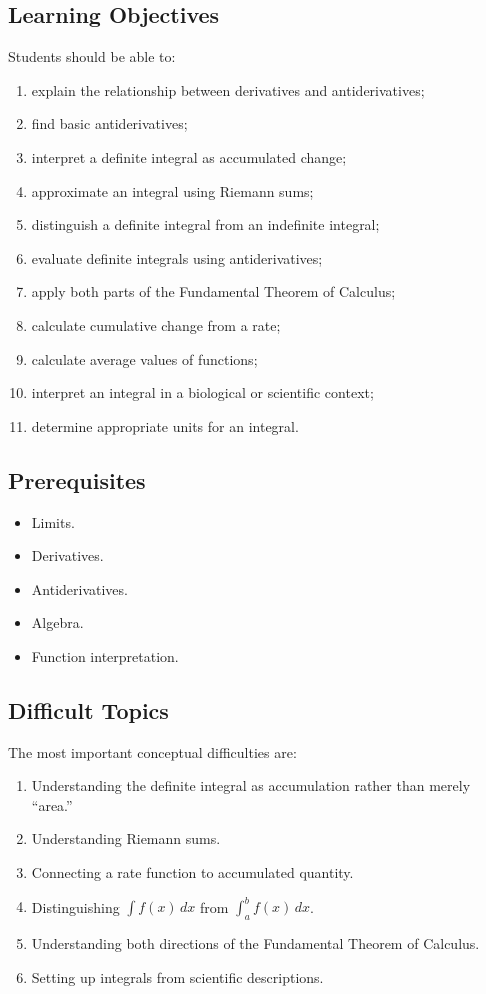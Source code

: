 \documentclass[11pt]{article}
\begin{document}
\subsection{Learning Objectives}

Students should be able to:

\begin{enumerate}
    \item explain the relationship between derivatives and antiderivatives;
    \item find basic antiderivatives;
    \item interpret a definite integral as accumulated change;
    \item approximate an integral using Riemann sums;
    \item distinguish a definite integral from an indefinite integral;
    \item evaluate definite integrals using antiderivatives;
    \item apply both parts of the Fundamental Theorem of Calculus;
    \item calculate cumulative change from a rate;
    \item calculate average values of functions;
    \item interpret an integral in a biological or scientific context;
    \item determine appropriate units for an integral.
\end{enumerate}

\subsection{Prerequisites}

\begin{itemize}
    \item Limits.
    \item Derivatives.
    \item Antiderivatives.
    \item Algebra.
    \item Function interpretation.
\end{itemize}

\subsection{Difficult Topics}

The most important conceptual difficulties are:

\begin{enumerate}
    \item Understanding the definite integral as accumulation rather than
          merely ``area.''
    \item Understanding Riemann sums.
    \item Connecting a rate function to accumulated quantity.
    \item Distinguishing $\int f(x)\,dx$ from
          $\int_a^b f(x)\,dx$.
    \item Understanding both directions of the Fundamental Theorem of
          Calculus.
    \item Setting up integrals from scientific descriptions.
\end{enumerate}
\end{document}
